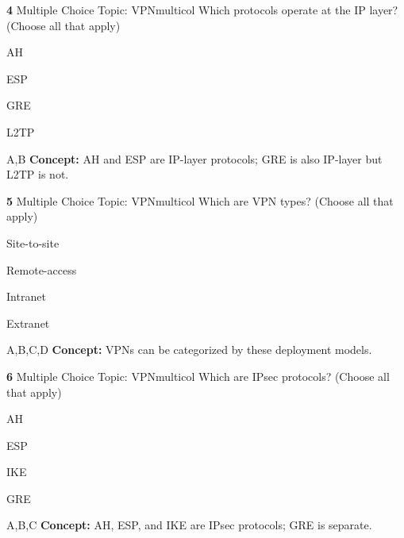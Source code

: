 \documentclass[10pt,a4paper]{article}
\begin{document}
\begin{qcard}{\color{white}\textbf{4} \hfill \small Multiple Choice \textbar{} Topic: VPN}{multicol}
Which protocols operate at the IP layer? (Choose all that apply)

\begin{qoptions}
\item AH
\item ESP
\item GRE
\item L2TP
\end{qoptions}
\begin{explainbox}{A,B}
\textbf{Concept:} AH and ESP are IP-layer protocols; GRE is also IP-layer but L2TP is not.
\end{explainbox}
\end{qcard}

\begin{qcard}{\color{white}\textbf{5} \hfill \small Multiple Choice \textbar{} Topic: VPN}{multicol}
Which are VPN types? (Choose all that apply)

\begin{qoptions}
\item Site-to-site
\item Remote-access
\item Intranet
\item Extranet
\end{qoptions}
\begin{explainbox}{A,B,C,D}
\textbf{Concept:} VPNs can be categorized by these deployment models.
\end{explainbox}
\end{qcard}

\begin{qcard}{\color{white}\textbf{6} \hfill \small Multiple Choice \textbar{} Topic: VPN}{multicol}
Which are IPsec protocols? (Choose all that apply)

\begin{qoptions}
\item AH
\item ESP
\item IKE
\item GRE
\end{qoptions}
\begin{explainbox}{A,B,C}
\textbf{Concept:} AH, ESP, and IKE are IPsec protocols; GRE is separate.
\end{explainbox}
\end{qcard}
\end{document}
